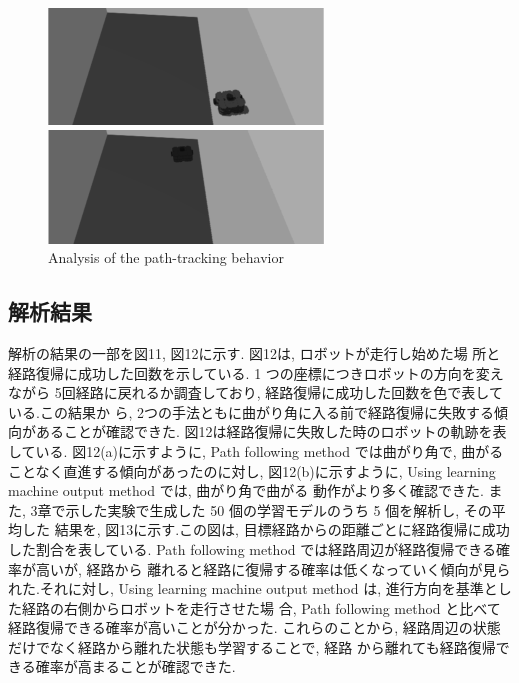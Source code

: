 \documentclass{jarticle}
\begin{document}
\begin{figure}[htbp]
  \begin{minipage}[t]{0.5\linewidth}
    \centering
    \includegraphics[keepaspectratio, scale=0.3]{figs/init4.png}
  \end{minipage}
  \begin{minipage}[t]{0.5\linewidth}
    \centering
    \includegraphics[keepaspectratio, scale=0.31]{figs/return3.png}
  \end{minipage}\vspace*{4mm}
  \caption{Analysis of the path-tracking behavior}
\end{figure}


\subsection{解析結果}
解析の結果の一部を図11, 図12に示す. 図12は, ロボットが走行し始めた場
所と経路復帰に成功した回数を示している. 1 つの座標につきロボットの方向を変えながら
5回経路に戻れるか調査しており, 経路復帰に成功した回数を色で表している.この結果か
ら, 2つの手法ともに曲がり角に入る前で経路復帰に失敗する傾向があることが確認できた.
図12は経路復帰に失敗した時のロボットの軌跡を表している. 図12(a)に示すように,
Path following method では曲がり角で, 曲がることなく直進する傾向があったのに対し, 
図12(b)に示すように, Using learning machine output method では, 曲がり角で曲がる
動作がより多く確認できた.
また, 3章で示した実験で生成した 50 個の学習モデルのうち 5 個を解析し, その平均した
結果を, 図13に示す.この図は, 目標経路からの距離ごとに経路復帰に成功した割合を表している. 
Path following method では経路周辺が経路復帰できる確率が高いが, 経路から
離れると経路に復帰する確率は低くなっていく傾向が見られた.それに対し, Using learning
machine output method は, 進行方向を基準とした経路の右側からロボットを走行させた場
合, Path following method と比べて経路復帰できる確率が高いことが分かった.
これらのことから, 経路周辺の状態だけでなく経路から離れた状態も学習することで, 経路
から離れても経路復帰できる確率が高まることが確認できた.
\end{document}
